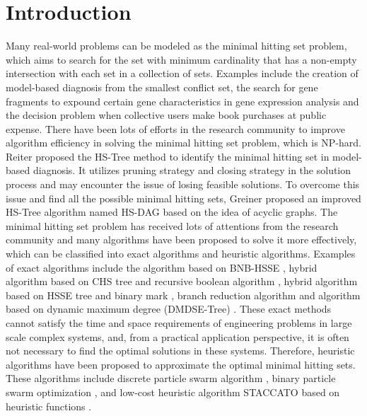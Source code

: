\section{Introduction}
Many real-world problems can be modeled as the minimal hitting set problem, which aims to search for the set with minimum cardinality that has a non-empty intersection with each set in a collection of sets.  
Examples include the creation of model-based diagnosis from the smallest conflict set, the search for gene fragments to expound certain gene characteristics in gene expression analysis and the decision problem when collective users make book purchases at public expense.
There have been lots of efforts in the research community to improve algorithm efficiency in solving the minimal hitting set problem, which is NP-hard.
Reiter \citep{c1reiter1987theory} proposed the HS-Tree method to identify the minimal hitting set in model-based diagnosis.
It utilizes pruning strategy and closing strategy in the solution process and may encounter the issue of losing feasible solutions.
To overcome this issue and find all the possible minimal hitting sets, Greiner \citep{c2greiner1989correction} proposed an improved HS-Tree algorithm named HS-DAG based on the idea of acyclic graphs.
The minimal hitting set problem has received lots of attentions from the research community and many algorithms have been proposed to solve it more effectively, which can be classified into exact algorithms and heuristic algorithms.
Examples of exact algorithms include the algorithm based on BNB-HSSE \citep{c3xiaomei}, hybrid algorithm based on CHS tree and recursive boolean algorithm \citep{c4wang2010research}, hybrid algorithm based on HSSE tree and binary mark \citep{c5feng2011method}, branch reduction algorithm \citep{c6shi2010exact} and algorithm based on dynamic maximum degree (DMDSE-Tree) \citep{c7zhang}.
These exact methods cannot satisfy the time and space requirements of engineering problems in large scale complex systems, and, from a practical application perspective, it is often not necessary to find the optimal solutions in these systems.
Therefore, heuristic algorithms have been proposed to approximate the optimal minimal hitting sets.
These algorithms include discrete particle swarm algorithm \citep{c8}, binary particle swarm optimization \citep{c9}, and low-cost heuristic algorithm STACCATO based on heuristic functions \citep{c10}.


